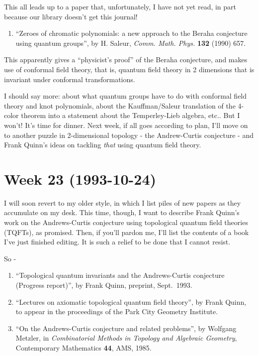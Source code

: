 \documentclass{article}
\def\tightlist{}
\begin{document}
This all leads up to a paper that, unfortunately, I have not yet read,
in part because our library doesn't get this journal!

\begin{enumerate}
\def\labelenumi{\arabic{enumi})}
\setcounter{enumi}{4}
\tightlist
\item
  ``Zeroes of chromatic polynomials: a new approach to the Beraha
  conjecture using quantum groups'', by H. Saleur, \emph{Comm. Math.
  Phys.} \textbf{132} (1990) 657.
\end{enumerate}

This apparently gives a ``physicist's proof'' of the Beraha conjecture,
and makes use of conformal field theory, that is, quantum field theory
in 2 dimensions that is invariant under conformal transformations.

I should say more: about what quantum groups have to do with conformal
field theory and knot polynomials, about the Kauffman/Saleur translation
of the 4-color theorem into a statement about the Temperley-Lieb
algebra, etc.. But I won't! It's time for dinner. Next week, if all goes
according to plan, I'll move on to another puzzle in 2-dimensional
topology - the Andrew-Curtis conjecture - and Frank Quinn's ideas on
tackling \emph{that} using quantum field theory.
\hypertarget{week-23-1993-10-24}{%
\section{Week 23 (1993-10-24)}\label{week-23-1993-10-24}}

I will soon revert to my older style, in which I list piles of new
papers as they accumulate on my desk. This time, though, I want to
describe Frank Quinn's work on the Andrews-Curtis conjecture using
topological quantum field theories (TQFTs), as promised. Then, if you'll
pardon me, I'll list the contents of a book I've just finished editing.
It is such a relief to be done that I cannot resist.

So -

\begin{enumerate}
\def\labelenumi{\arabic{enumi})}
\item
  ``Topological quantum invariants and the Andrews-Curtis conjecture
  (Progress report)'', by Frank Quinn, preprint, Sept.~1993.
\item
  ``Lectures on axiomatic topological quantum field theory'', by Frank
  Quinn, to appear in the proceedings of the Park City Geometry
  Institute.
\item
  ``On the Andrews-Curtis conjecture and related problems'', by Wolfgang
  Metzler, in \emph{Combinatorial Methods in Topology and Algebraic
  Geometry}, Contemporary Mathematics \textbf{44}, AMS, 1985.
\end{enumerate}
\end{document}
